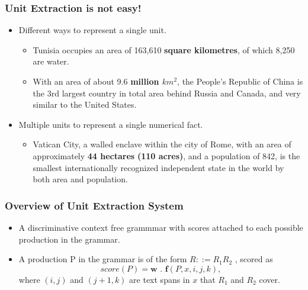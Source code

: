 \documentclass{beamer}
\begin{document}
\begin{frame}
 \frametitle{Unit Extraction is not easy!} \pause
 
 \begin{itemize}
    \item Different ways to represent a single unit. \pause
    
    \begin{itemize}
     \item Tunisia occupies an area of 163,610 \textbf{square kilometres}, of which 8,250 are water. \pause
     \item With an area of about 9.6 \textbf{million $km^{2}$}, the People's Republic of China is the 3rd largest country in total area behind Russia and Canada, and very similar to the United States.
    \end{itemize}
\pause
    
    \item Multiple units to represent a single numerical fact. \pause
    \begin{itemize}
      \item Vatican City, a walled enclave within the city of Rome, with an area of approximately \textbf{44 hectares} \textbf{(110 acres)}, and a population of 842, is the smallest internationally recognized independent state in the world by both area and population.
    \end{itemize}
 \end{itemize}
\end{frame}
\begin{frame}
 \frametitle{Overview of Unit Extraction System} \pause
 
 \begin{itemize}
  
  \item A discriminative context free grammmar with scores
attached to each possible production in the grammar. \pause
  \item A production P in the grammar is of the form  $ R ::= R_{1} R_{2}$ , scored as 
\begin{equation*}
	score(P) = \textbf{w . f}(P, x, i, j, k), 
\end{equation*}
where $(i,j)$ and $(j+1,k)$ are text spans in $x$ that $R_{1}$ and $R_{2}$
cover.
 \end{itemize}
\end{frame}
\end{document}
